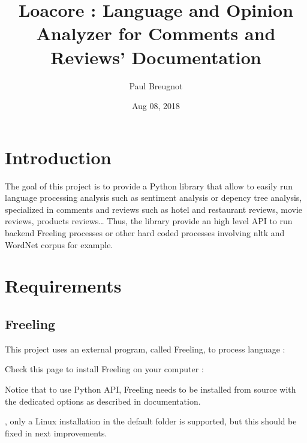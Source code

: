 \documentclass[letterpaper,10pt,english]{sphinxmanual}
\title{Loacore : Language and Opinion Analyzer for Comments and Reviews' Documentation}
\date{Aug 08, 2018}
\author{Paul Breugnot}
\begin{document}
\maketitle
\sphinxtableofcontents
{}\label{\detokenize{index::doc}}



\chapter{Introduction}
\label{\detokenize{introduction:introduction}}\label{\detokenize{introduction::doc}}

The goal of this project is to provide a Python library that allow to easily run language processing analysis such as sentiment analysis or depency tree analysis, specialized in comments and reviews such as hotel and restaurant reviews, movie reviews, products reviews… Thus, the library provide an high level API to run backend Freeling processes or other hard coded processes involving nltk and WordNet corpus for example.



\chapter{Requirements}
\label{\detokenize{requirements:requirements}}\label{\detokenize{requirements::doc}}

\section{Freeling}
\label{\detokenize{requirements:freeling}}
\begin{DUlineblock}{0em}
\item[] This project uses an external program, called Freeling, to process language : 
\item[] Check this page to install Freeling on your computer : 
\item[] Notice that to use Python API, Freeling needs to be installed from source with the dedicated options as described in documentation.
\item[] , only a Linux installation in the default folder  is supported, but this should be fixed in next improvements.
\end{DUlineblock}
\end{document}
